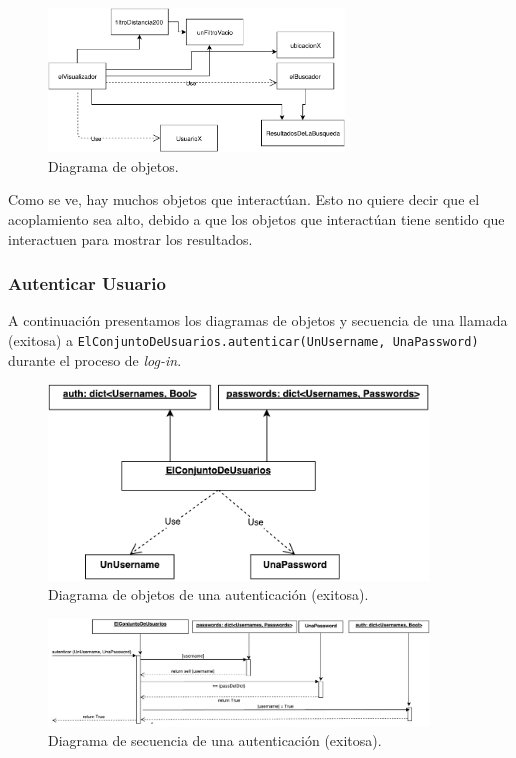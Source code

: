 \begin{figure}[H]
  \centering
  \includegraphics[width=0.7\textwidth]{diagramas/objetos_4.pdf}
  \caption{\normalfont Diagrama de objetos.}
\end{figure}

Como se ve, hay muchos objetos que interactúan. Esto no quiere decir que el acoplamiento sea alto, debido a que los objetos que interactúan tiene sentido que interactuen para mostrar los resultados.

\subsubsection{Autenticar Usuario}

\par A continuación presentamos los diagramas de objetos y secuencia de una llamada (exitosa) a 
\texttt{ElConjuntoDeUsuarios.autenticar(UnUsername, UnaPassword)} durante el proceso de \textit{log-in}.

\begin{figure}[ht]
    \centering
    \includegraphics[width=0.9\textwidth]{diagramas/ObjetosLogIn.pdf}
    \caption{Diagrama de objetos de una autenticación (exitosa).}\label{ObjLogIn}
\end{figure}

\begin{figure}[ht]
    \centering
    \includegraphics[width=0.9\textwidth]{diagramas/SecuenciaLogIn.pdf}
    \caption{Diagrama de secuencia de una autenticación (exitosa).}\label{SecLogIn}
\end{figure}

